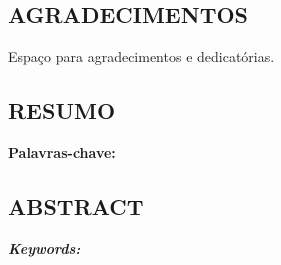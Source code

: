 \documentclass[a4paper, 12pt]{article}
\begin{document}
\newpage
\thispagestyle{empty}
\begin{center}
\section*{AGRADECIMENTOS}
\end{center}

\onehalfspacing

Espaço para agradecimentos e dedicatórias.

\newpage
\thispagestyle{empty}
\begin{center}
\section*{RESUMO}
\end{center}

\blindtext

\textbf{Palavras-chave: }
\newpage
\thispagestyle{empty}

\begin{center}
\section*{ABSTRACT}
\end{center}

\blindtext

\textit{\textbf{Keywords:} }


\newpage
\pagestyle{empty}
\begin{center}
\renewcommand\listfigurename{LISTA DE FIGURAS}
\listoffigures
\end{center}

\newpage
\begin{center}
\renewcommand\listtablename{LISTA DE TABELAS}
\listoftables
\end{center}

\newpage
\begin{center}
\renewcommand{\nomname}{LISTA DE ABREVIAÇÕES}
\printnomenclature
\end{center}

\newpage
\begin{center}
\renewcommand\contentsname{SUMÁRIO}
\tableofcontents
\end{center}
\clearpage
\pagestyle{formato}
\pagebreak

\setcounter{page}{12}
\end{document}
